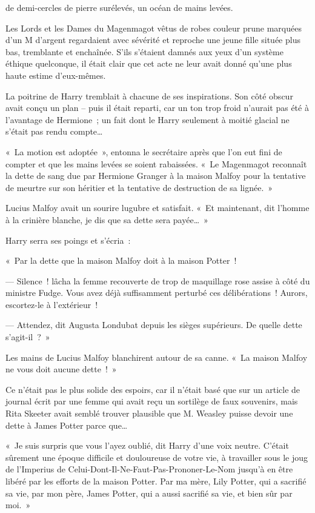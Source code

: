 
 de demi-cercles de pierre surélevés, un océan de mains levées.

\hplettrineextrapara
Les Lords et les Dames du Magenmagot vêtus de robes couleur prune marquées d'un M d'argent regardaient avec sévérité et reproche une jeune fille située plus bas, tremblante et enchaînée.
S'ils s'étaient damnés aux yeux d'un système éthique quelconque, il était clair que cet acte ne leur avait donné qu'une plus haute estime d'eux-mêmes.

La poitrine de Harry tremblait à chacune de ses inspirations.
Son côté obscur avait conçu un plan -- puis il était reparti, car un ton trop froid n'aurait pas été à l'avantage de Hermione~; un fait dont le Harry seulement à moitié glacial ne s'était pas rendu compte…

«~La motion est adoptée~», entonna le secrétaire après que l'on eut fini de compter et que les mains levées se soient rabaissées.
«~Le Magenmagot reconnaît la dette de sang due par Hermione Granger à la maison Malfoy pour la tentative de meurtre sur son héritier et la tentative de destruction de sa lignée.~»

Lucius Malfoy avait un sourire lugubre et satisfait.
«~Et maintenant, dit l'homme à la crinière blanche, je dis que sa dette sera payée…~»

Harry serra ses poings et s'écria~:

«~Par la dette que la maison Malfoy doit à la maison Potter~!

--- Silence~! lâcha la femme recouverte de trop de maquillage rose assise à côté du ministre Fudge.
Vous avez déjà suffisamment perturbé ces délibérations~!
Aurors, escortez-le à l'extérieur~!

--- Attendez, dit Augusta Londubat depuis les sièges supérieurs.
De quelle dette s'agit-il~?~»

Les mains de Lucius Malfoy blanchirent autour de sa canne.
«~La maison Malfoy ne vous doit aucune dette~!~»

Ce n'était pas le plus solide des espoirs, car il n'était basé que sur un article de journal écrit par une femme qui avait reçu un sortilège de faux souvenirs, mais Rita Skeeter avait semblé trouver plausible que M. Weasley puisse devoir une dette à James Potter parce que…

«~Je suis surpris que vous l'ayez oublié, dit Harry d'une voix neutre.
C'était sûrement une époque difficile et douloureuse de votre vie, à travailler sous le joug de l'Imperius de Celui-Dont-Il-Ne-Faut-Pas-Prononer-Le-Nom jusqu'à en être libéré par les efforts de la maison Potter.
Par ma mère, Lily Potter, qui a sacrifié sa vie, par mon père, James Potter, qui a aussi sacrifié sa vie, et bien sûr par moi.~»

